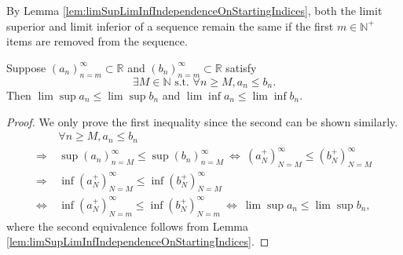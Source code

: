 \begin{rem}
  By Lemma \ref{lem:limSupLimInfIndependenceOnStartingIndices}, 
  both the limit superior and limit inferior of a sequence
  remain the same if the first $m\in\mathbb{N}^+$ items
  are removed from the sequence.
\end{rem}

\begin{lem}
  \label{lem:limitSupAndInfPreserveOrder}
  Suppose $(a_{n})_{n=m}^{\infty}\subset \mathbb{R}$
  and $(b_{n})_{n=m}^{\infty}\subset \mathbb{R}$ satisfy
  \begin{displaymath}
    \exists M\in \mathbb{N} \text{ s.t. }
    \forall n\ge M, a_{n}\le b_{n}.
  \end{displaymath}
  Then $\lim\sup a_{n}\le \lim\sup b_{n}$
  and $\lim\inf a_{n}\le \lim\inf b_{n}$.
\end{lem}
\begin{proof}
  We only prove the first inequality
  since the second can be shown similarly. 
  \begin{align*}
    &\ \forall n\ge M, a_{n}\le b_{n}
    \\
    \Rightarrow &\ 
    \sup(a_{n})_{n=M}^{\infty}\le \sup(b_{n})_{n=M}^{\infty}
    \ \Leftrightarrow\ 
    (a_{N}^{+})_{N=M}^{\infty} \le (b_{N}^{+})_{N=M}^{\infty}\\
    \Rightarrow &\  
    \inf(a_{N}^{+})_{N=M}^{\infty} \le \inf(b_{N}^{+})_{N=M}^{\infty}
    \\ \Leftrightarrow & \  
    \inf(a_{N}^{+})_{N=m}^{\infty} \le \inf(b_{N}^{+})_{N=m}^{\infty}
    \ \Leftrightarrow\ 
    \lim\sup a_{n} \le \lim\sup b_{n},
  \end{align*}
  where the second equivalence follows from
  Lemma \ref{lem:limSupLimInfIndependenceOnStartingIndices}. 
\end{proof}

